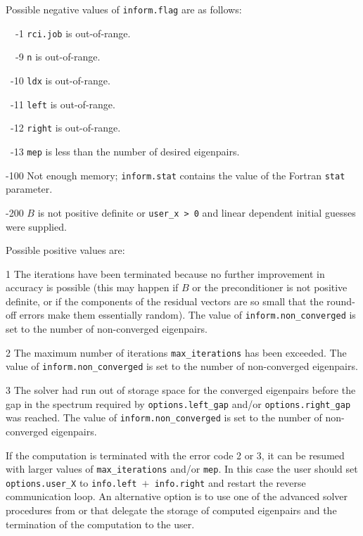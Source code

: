 \noindent
Possible negative values of {\tt inform.flag}
are as follows:
%
\begin{description}
%
\item{~~-1}
\hskip 9pt
{\tt rci.job}  is out-of-range.
%
\item{~~-9}
\hskip 7pt
{\tt n} is out-of-range.
%
\item{~-10}
\hskip 7pt
{\tt ldx} is out-of-range.
%
\item{~-11}
\hskip 7pt
{\tt left} is out-of-range.
%
\item{~-12}
\hskip 7pt
{\tt right} is out-of-range.
%
\item{~-13}
\hskip 7pt
{\tt mep} is less than 
the number of desired eigenpairs.
%
\item{-100}
\hskip 4pt
Not enough memory;
{\tt inform.stat} contains the value of the Fortran {\tt stat} parameter.
%
\item{-200}
\hskip 4pt
$B$ is not positive definite or {\tt user\_x > 0} and
linear dependent initial guesses were supplied.
%
\end{description}

\noindent
Possible positive values  are: 
%
\begin{description}
\item{1}
\hskip 9pt
The iterations have been terminated because no further improvement
in accuracy is possible (this may happen if $B$ or the preconditioner is
not positive definite, or if the components of the residual vectors
are so small that the round-off
errors make them essentially random).
The value of {\tt inform.non\_converged} is set to the number
of non-converged eigenpairs.
\item{2}
\hskip 9pt
The maximum number of iterations {\tt max\_iterations} has been exceeded.
The value of {\tt inform.non\_converged} is set to the number
of non-converged eigenpairs.
\item{3}
\hskip 9pt
The solver had run
out of storage space for the converged eigenpairs
before the gap in the spectrum 
required by {\tt options.left\_gap} and/or {\tt options.right\_gap}
was reached.
The value of {\tt inform.non\_converged} is set to the number
of non-converged eigenpairs.
%
\end{description}

If the computation is terminated with the error code 2 or 3,
it can be resumed with larger values of {\tt max\_iterations} and/or {\tt mep}.
In this case the user should set {\tt options.user\_X} to
{\tt info.left $+$ info.right}
and restart the reverse communication loop.
An alternative option is to use
one of the advanced solver procedures
from {\tt \advanced} or {\tt \engine}
that delegate the storage of computed eigenpairs and
the termination of the computation to the user.

